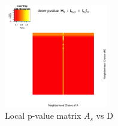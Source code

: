 \documentclass[12pt]{report}
\begin{document}
 
\begin{figure}[H]
\captionsetup{format=plain}
\centering
\includegraphics[width=0.4\textwidth]{../figure/P_A_D.png}
\caption{Local p-value matrix $A_{s}$ vs D}
\label{fig:PAD}
\end{figure} 

 
 
 
 
\end{document}
